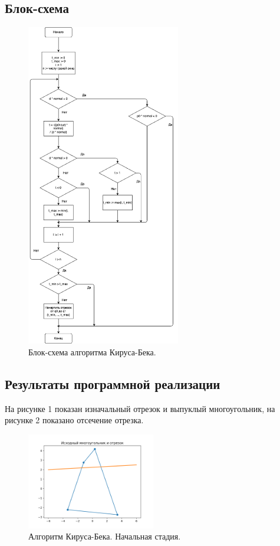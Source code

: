 \documentclass[areasetadvanced]{scrartcl}
\begin{document}
\subsection{Блок-схема}
\begin{figure}[H]
    \centering
    \includegraphics[width=0.6\textwidth]{../images/BlockGraphic.png}
    \caption{Блок-схема алгоритма Кируса-Бека.}
    \label{fig:blockschema}
\end{figure}

\subsection{Результаты программной реализации}
На рисунке 1 показан изначальный отрезок и выпуклый многоугольник, на рисунке 2 показано отсечение отрезка. 
\begin{figure}[H]
    \centering
    \includegraphics[width=0.5\textwidth]{../images/step1_initial.png}
    \caption{Алгоритм Кируса-Бека. Начальная стадия.}
    \label{fig:initial}
\end{figure}
\end{document}
